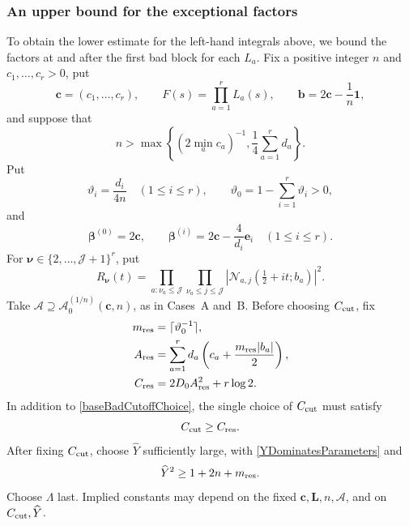 \documentclass[oneside, 12pt]{amsart}
\theoremstyle{definition}
\begin{document}
{		\subsubsection*{An upper bound for the exceptional factors}
		
		To obtain the lower estimate for the left-hand integrals above, we
		bound the factors at and after the first bad block for each $L_a$.
		Fix a positive
		integer $n$ and $c_1,\ldots,c_r>0$, put
		\[
		\boldsymbol c=(c_1,\ldots,c_r),\qquad
		F(s)=\prod_{a=1}^rL_a(s),\qquad
		\boldsymbol b=2\boldsymbol c-\frac1n\boldsymbol1,
		\]
		and suppose that
		\begin{equation}\label{oneOverNConditions}
			n>\max\left\{(2\min_a c_a)^{-1},
			\frac14\sum_{a=1}^r d_a\right\}.
		\end{equation}
		Put
		\[
		\vartheta_i=\frac{d_i}{4n}\quad(1\leq i\leq r),
		\qquad
		\vartheta_0=1-\sum_{i=1}^r\vartheta_i>0,
		\]
		and
		\[
		\boldsymbol\beta^{(0)}=2\boldsymbol c,
		\qquad
		\boldsymbol\beta^{(i)}
		=2\boldsymbol c-\frac4{d_i}\boldsymbol e_i
		\quad(1\leq i\leq r).
		\]
		For $\boldsymbol\nu\in\{2,\ldots,\mathscr J+1\}^r$, put
		\[
		R_{\boldsymbol\nu}(t)=
		\prod_{a:\nu_a\leq\mathscr J}
		\prod_{\nu_a\leq j\leq\mathscr J}
		|\mathcal N_{a,j}(\tfrac12+it;b_a)|^2.
		\]
		Take $\mathscr A\supseteq\mathscr A_0^{(1/n)}(\boldsymbol c,n)$,
		as in Cases~A and~B. Before choosing $C_{\rm cut}$, fix
		\begin{equation}\label{residualMajorantParameters}
			\begin{split}
				m_{\rm res}&=\lceil\vartheta_0^{-1}\rceil,\\
				A_{\rm res}&=\sum_{a=1}^r d_a
				\left(c_a+\frac{m_{\rm res}|b_a|}{2}\right),\\
				C_{\rm res}&=2D_0 A_{\rm res}^2+r\log2 .
			\end{split}
		\end{equation}
		In addition to \eqref{baseBadCutoffChoice}, the single choice of
		$C_{\rm cut}$ must satisfy
		\begin{equation}\label{residualCutoffChoice}
			C_{\rm cut}\geq C_{\rm res}.
		\end{equation}
		After fixing $C_{\rm cut}$, choose $\widehat Y$ sufficiently large,
		with \eqref{YDominatesParameters} and
		\begin{equation}\label{oneOverNParameterDominance}
			\widehat Y^2\geq1+2n+m_{\rm res}.
		\end{equation}
		Choose $\Lambda$ last.  Implied constants may depend on the fixed
		$\boldsymbol c,\boldsymbol L,n,\mathscr A$, and on $C_{\rm cut},\widehat Y$.
}
\end{document}
